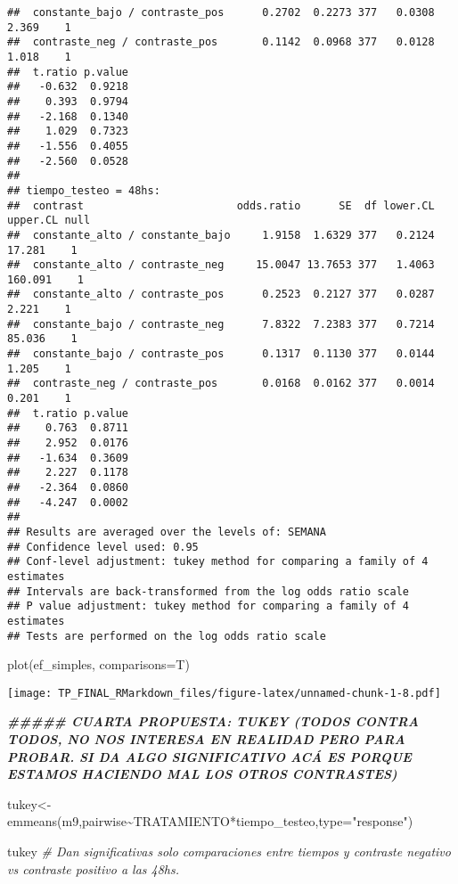 \documentclass[
]{article}
\newenvironment{Shaded}{\begin{snugshade}}{\end{snugshade}}
\newcommand{\AttributeTok}[1]{\textcolor[rgb]{0.77,0.63,0.00}{#1}}
\newcommand{\CommentTok}[1]{\textcolor[rgb]{0.56,0.35,0.01}{\textit{#1}}}
\newcommand{\DocumentationTok}[1]{\textcolor[rgb]{0.56,0.35,0.01}{\textbf{\textit{#1}}}}
\newcommand{\FunctionTok}[1]{\textcolor[rgb]{0.00,0.00,0.00}{#1}}
\newcommand{\NormalTok}[1]{#1}
\newcommand{\OtherTok}[1]{\textcolor[rgb]{0.56,0.35,0.01}{#1}}
\newcommand{\SpecialCharTok}[1]{\textcolor[rgb]{0.00,0.00,0.00}{#1}}
\newcommand{\StringTok}[1]{\textcolor[rgb]{0.31,0.60,0.02}{#1}}
\begin{document}
\begin{verbatim}
##  constante_bajo / contraste_pos      0.2702  0.2273 377   0.0308    2.369    1
##  contraste_neg / contraste_pos       0.1142  0.0968 377   0.0128    1.018    1
##  t.ratio p.value
##   -0.632  0.9218
##    0.393  0.9794
##   -2.168  0.1340
##    1.029  0.7323
##   -1.556  0.4055
##   -2.560  0.0528
## 
## tiempo_testeo = 48hs:
##  contrast                        odds.ratio      SE  df lower.CL upper.CL null
##  constante_alto / constante_bajo     1.9158  1.6329 377   0.2124   17.281    1
##  constante_alto / contraste_neg     15.0047 13.7653 377   1.4063  160.091    1
##  constante_alto / contraste_pos      0.2523  0.2127 377   0.0287    2.221    1
##  constante_bajo / contraste_neg      7.8322  7.2383 377   0.7214   85.036    1
##  constante_bajo / contraste_pos      0.1317  0.1130 377   0.0144    1.205    1
##  contraste_neg / contraste_pos       0.0168  0.0162 377   0.0014    0.201    1
##  t.ratio p.value
##    0.763  0.8711
##    2.952  0.0176
##   -1.634  0.3609
##    2.227  0.1178
##   -2.364  0.0860
##   -4.247  0.0002
## 
## Results are averaged over the levels of: SEMANA 
## Confidence level used: 0.95 
## Conf-level adjustment: tukey method for comparing a family of 4 estimates 
## Intervals are back-transformed from the log odds ratio scale 
## P value adjustment: tukey method for comparing a family of 4 estimates 
## Tests are performed on the log odds ratio scale
\end{verbatim}

\begin{Shaded}
\begin{Highlighting}[]
\FunctionTok{plot}\NormalTok{(ef\_simples, }\AttributeTok{comparisons=}\NormalTok{T) }
\end{Highlighting}
\end{Shaded}

\texttt{[image: TP\_FINAL\_RMarkdown\_files/figure-latex/unnamed-chunk-1-8.pdf]}

\begin{Shaded}
\begin{Highlighting}[]
\DocumentationTok{\#\#\#\#\# CUARTA PROPUESTA: TUKEY (TODOS CONTRA TODOS, NO NOS INTERESA EN REALIDAD PERO PARA PROBAR. SI DA ALGO SIGNIFICATIVO ACÁ ES PORQUE ESTAMOS HACIENDO MAL LOS OTROS CONTRASTES)}

\NormalTok{tukey}\OtherTok{\textless{}{-}}\FunctionTok{emmeans}\NormalTok{(m9,pairwise}\SpecialCharTok{\textasciitilde{}}\NormalTok{TRATAMIENTO}\SpecialCharTok{*}\NormalTok{tiempo\_testeo,}\AttributeTok{type=}\StringTok{"response"}\NormalTok{)}

\NormalTok{tukey }\CommentTok{\# Dan significativas solo comparaciones entre tiempos y contraste negativo vs contraste positivo a las 48hs.}
\end{Highlighting}
\end{Shaded}
\end{document}
